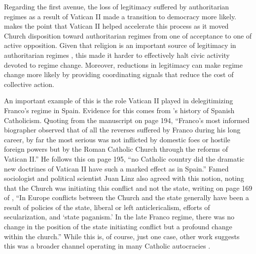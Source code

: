 \documentclass[12pt]{article}
\numberwithin{equation}{section}
\begin{document}
\label{par:legit_beg}
Regarding the first avenue, the loss of legitimacy suffered by authoritarian regimes as a result of Vatican II made a transition to democracy more likely. \cite{Huntington1991} makes the point that Vatican II helped accelerate this process as it moved Church disposition toward authoritarian regimes from one of acceptance to one of active opposition. Given that religion is an important source of legitimacy in authoritarian regimes \citep{Weber1921,Billings1994}, this made it harder to effectively halt civic activity devoted to regime change. Moreover, reductions in legitimacy can make regime change more likely by providing coordinating signals that reduce the cost of collective action.

An important example of this is the role Vatican II played in delegitimizing Franco's regime in Spain. Evidence for this comes from \cite{Payne1984}'s history of Spanish Catholicism. Quoting from the manuscript on page 194, ``Franco's most informed biographer observed that of all the reverses suffered by Franco during his long career, by far the most serious was not inflicted by domestic foes or hostile foreign powers but by the Roman Catholic Church through the reforms of Vatican II.'' He follows this on page 195, ``no Catholic country did the dramatic new doctrines of Vatican II have such a marked effect as in Spain.'' Famed sociologist and political scientist Juan Linz also agreed with this notion, noting that the Church was initiating this conflict and not the state, writing on page 169 of \cite{Linz1991}, ``In Europe conflicts between the Church and the state generally have been a result of policies of the state, liberal or left anticlericalism, efforts of secularization, and `state paganism.' In the late Franco regime, there was no change in the position of the state initiating conflict but a profound change within the church.'' While this is, of course, just one case, other work suggests this was a broader channel operating in many Catholic autocracies \citep{Andersen2019}.
\label{par:legit_end}
\end{document}

